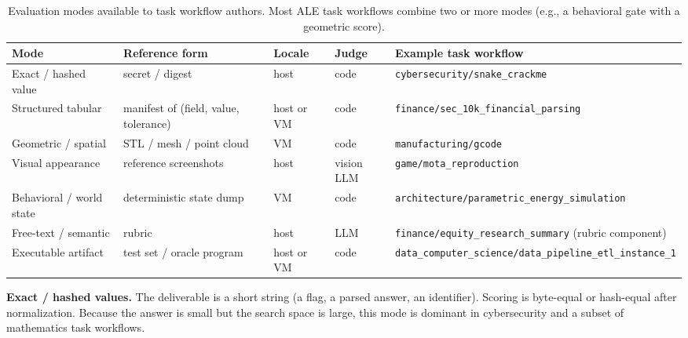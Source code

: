 \begin{table}[htbp]
    \centering
    \footnotesize
    \setlength{\tabcolsep}{4pt}
    \begin{tabular}{>{\raggedright\arraybackslash}p{2.4cm} >{\raggedright\arraybackslash}p{3.0cm} >{\raggedright\arraybackslash}p{1.6cm} >{\raggedright\arraybackslash}p{1.6cm} >{\raggedright\arraybackslash}p{4.0cm}}
        \toprule
        \textbf{Mode} & \textbf{Reference form} & \textbf{Locale} & \textbf{Judge} & \textbf{Example task workflow}\\
        \midrule
        Exact / hashed value & secret / digest & host & code & \texttt{cybersecurity/}\allowbreak\texttt{snake\_crackme}\\
        Structured tabular & manifest of (field, value, tolerance) & host or VM & code & \texttt{finance/}\allowbreak\texttt{sec\_10k\_}\allowbreak\texttt{financial\_parsing}\\
        Geometric / spatial & STL / mesh / point cloud & VM & code & \texttt{manufacturing/}\allowbreak\texttt{gcode}\\
        Visual appearance & reference screenshots & host & vision LLM & \texttt{game/}\allowbreak\texttt{mota\_reproduction}\\
        Behavioral / world state & deterministic state dump & VM & code & \texttt{architecture/}\allowbreak\texttt{parametric\_}\allowbreak\texttt{energy\_simulation}\\
        Free-text / semantic & rubric & host & LLM & \texttt{finance/}\allowbreak\texttt{equity\_research\_}\allowbreak\texttt{summary} (rubric component)\\
        Executable artifact & test set / oracle program & host or VM & code & \texttt{data\_computer\_}\allowbreak\texttt{science/}\allowbreak\texttt{data\_pipeline\_}\allowbreak\texttt{etl\_instance\_1}\\
        \bottomrule
    \end{tabular}
    \caption{Evaluation modes available to task workflow authors. Most ALE task workflows combine two or more modes (e.g., a behavioral gate with a geometric score).}
    \label{tab:eval-modes}
\end{table}

\noindent \textbf{Exact / hashed values.} The deliverable is a short string (a flag, a parsed answer, an identifier). Scoring is byte-equal or hash-equal after normalization. Because the answer is small but the search space is large, this mode is dominant in cybersecurity and a subset of mathematics task workflows.

